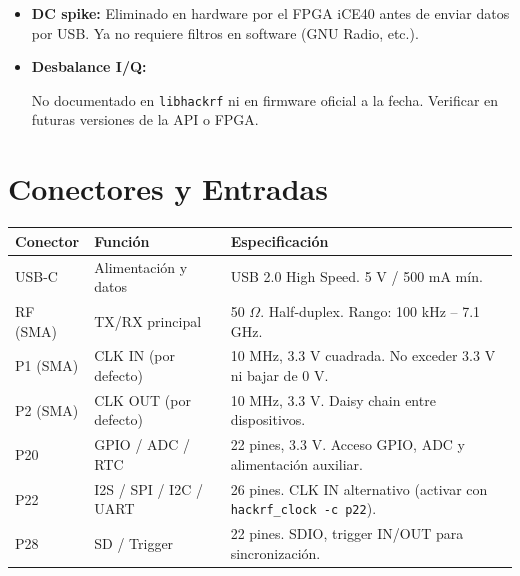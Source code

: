 \documentclass[11pt]{article}
\begin{document}
\begin{itemize}
    \item \textbf{DC spike:} Eliminado en hardware por el FPGA iCE40 antes de enviar datos por USB. Ya no requiere filtros en software (GNU Radio, etc.).
    \item \textbf{Desbalance I/Q:}
    \begin{pendiente}
    No documentado en \texttt{libhackrf} ni en firmware oficial a la fecha. Verificar en futuras versiones de la API o FPGA.
    \end{pendiente}
\end{itemize}

\section{Conectores y Entradas}

\begin{table}[h]
    \centering
    \small
    \begin{tabular}{p{}p{}p{}}
        \toprule
        \textbf{Conector} & \textbf{Función} & \textbf{Especificación} \\
        \midrule
        USB-C      & Alimentación y datos  & USB 2.0 High Speed. 5 V / 500 mA mín. \\
        RF (SMA)   & TX/RX principal       & 50 $\Omega$. Half-duplex. Rango: 100 kHz -- 7.1 GHz. \\
        P1 (SMA)   & CLK IN (por defecto)  & 10 MHz, 3.3 V cuadrada. No exceder 3.3 V ni bajar de 0 V. \\
        P2 (SMA)   & CLK OUT (por defecto) & 10 MHz, 3.3 V. Daisy chain entre dispositivos. \\
        P20        & GPIO / ADC / RTC      & 22 pines, 3.3 V. Acceso GPIO, ADC y alimentación auxiliar. \\
        P22        & I2S / SPI / I2C / UART & 26 pines. CLK IN alternativo (activar con \texttt{hackrf\_clock -c p22}). \\
        P28        & SD / Trigger          & 22 pines. SDIO, trigger IN/OUT para sincronización. \\
        \bottomrule
    \end{tabular}
\end{table}
\end{document}
